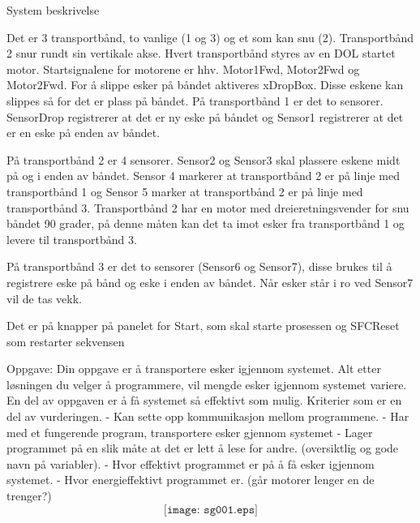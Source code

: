 

System beskrivelse

Det er 3 transportbånd, to vanlige (1 og 3) og et som kan snu (2). Transportbånd 2 snur rundt sin vertikale akse. Hvert transportbånd styres av en DOL startet motor. Startsignalene for motorene er hhv. Motor1Fwd, Motor2Fwd og Motor2Fwd. For å slippe esker på båndet aktiveres xDropBox. Disse eskene kan slippes så for det er plass på båndet. 
På transportbånd 1 er det to sensorer. SensorDrop registrerer at det er ny eske på båndet og Sensor1 registrerer at det er en eske på enden av båndet.
 
På transportbånd 2 er 4 sensorer. Sensor2 og Sensor3 skal plassere eskene midt på og i enden av båndet. Sensor 4 markerer at transportbånd 2 er på linje med transportbånd 1 og Sensor 5 marker at transportbånd 2 er på linje med transportbånd 3. Transportbånd 2 har en motor med dreieretningsvender for snu båndet 90 grader, på denne måten kan det ta imot esker fra transportbånd 1 og levere til transportbånd 3.

På transportbånd 3 er det to sensorer (Sensor6 og Sensor7), disse brukes til å registrere eske på bånd og eske i enden av båndet. Når esker står i ro ved Sensor7 vil de tas vekk. 

Det er på knapper på panelet for Start, som skal starte prosessen og SFCReset som restarter sekvensen 

Oppgave:
Din oppgave er å transportere esker igjennom systemet. Alt etter løsningen du velger å programmere, vil mengde esker igjennom systemet variere. En del av oppgaven er å få systemet så effektivt som mulig. 
Kriterier som er en del av vurderingen. 
-	Kan sette opp kommunikasjon mellom programmene. 
-	Har med et fungerende program, transportere esker gjennom systemet
-	Lager programmet på en slik måte at det er lett å lese for andre. (oversiktlig og gode navn på variabler). 
-	Hvor effektivt programmet er på å få esker igjennom systemet. 
-	Hvor energieffektivt programmet er. (går motorer lenger en de trenger?)
$$\texttt{[image: sg001.eps]}$$


